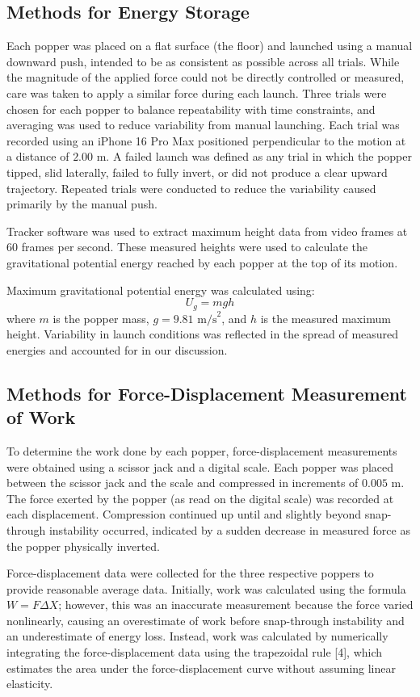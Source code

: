 \documentclass[12pt]{article}
\begin{document}
\subsection{Methods for Energy Storage}
Each popper was placed on a flat surface (the floor) and launched using a manual downward push, intended to be as consistent as possible across all trials. While the magnitude of the applied force could not be directly controlled or measured, care was taken to apply a similar force during each launch. Three trials were chosen for each popper to balance repeatability with time constraints, and averaging was used to reduce variability from manual launching. Each trial was recorded using an iPhone 16 Pro Max positioned perpendicular to the motion at a distance of $2.00\text{ m}$. A failed launch was defined as any trial in which the popper tipped, slid laterally, failed to fully invert, or did not produce a clear upward trajectory. Repeated trials were conducted to reduce the variability caused primarily by the manual push.

Tracker software was used to extract maximum height data from video frames at 60 frames per second. These measured heights were used to calculate the gravitational potential energy reached by each popper at the top of its motion.

Maximum gravitational potential energy was calculated using:
$$U_g = mgh$$
where $m$ is the popper mass, $g = 9.81\text{ m/s}^2$, and $h$ is the measured maximum height. Variability in launch conditions was reflected in the spread of measured energies and accounted for in our discussion.

\subsection{Methods for Force-Displacement Measurement of Work}
To determine the work done by each popper, force-displacement measurements were obtained using a scissor jack and a digital scale. Each popper was placed between the scissor jack and the scale and compressed in increments of $0.005\text{ m}$. The force exerted by the popper (as read on the digital scale) was recorded at each displacement. Compression continued up until and slightly beyond snap-through instability occurred, indicated by a sudden decrease in measured force as the popper physically inverted.

Force-displacement data were collected for the three respective poppers to provide reasonable average data. Initially, work was calculated using the formula $W = F \Delta X$; however, this was an inaccurate measurement because the force varied nonlinearly, causing an overestimate of work before snap-through instability and an underestimate of energy loss. Instead, work was calculated by numerically integrating the force-displacement data using the trapezoidal rule [4], which estimates the area under the force-displacement curve without assuming linear elasticity. 
\end{document}
